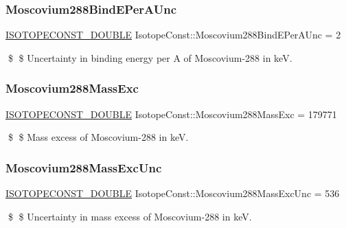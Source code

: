 \subsubsection{\texorpdfstring{Moscovium288\+Bind\+E\+Per\+A\+Unc}{Moscovium288BindEPerAUnc}}
{\footnotesize\ttfamily \mbox{\hyperlink{group___isotope_const-_macros_ga8f45a7272ce02c0b4c65c44636ed719a}{I\+S\+O\+T\+O\+P\+E\+C\+O\+N\+S\+T\+\_\+\+D\+O\+U\+B\+LE}} Isotope\+Const\+::\+Moscovium288\+Bind\+E\+Per\+A\+Unc = 2}

\$ \$ Uncertainty in binding energy per A of Moscovium-\/288 in keV. \mbox{\label{group___isotope_const-_moscovium-_mc288_ga1abf3f1761fec54f884dcca4505b56b6}} 
\subsubsection{\texorpdfstring{Moscovium288\+Mass\+Exc}{Moscovium288MassExc}}
{\footnotesize\ttfamily \mbox{\hyperlink{group___isotope_const-_macros_ga8f45a7272ce02c0b4c65c44636ed719a}{I\+S\+O\+T\+O\+P\+E\+C\+O\+N\+S\+T\+\_\+\+D\+O\+U\+B\+LE}} Isotope\+Const\+::\+Moscovium288\+Mass\+Exc = 179771}

\$ \$ Mass excess of Moscovium-\/288 in keV. \mbox{\label{group___isotope_const-_moscovium-_mc288_gadc300d3a1daad8758187973513b24141}} 
\subsubsection{\texorpdfstring{Moscovium288\+Mass\+Exc\+Unc}{Moscovium288MassExcUnc}}
{\footnotesize\ttfamily \mbox{\hyperlink{group___isotope_const-_macros_ga8f45a7272ce02c0b4c65c44636ed719a}{I\+S\+O\+T\+O\+P\+E\+C\+O\+N\+S\+T\+\_\+\+D\+O\+U\+B\+LE}} Isotope\+Const\+::\+Moscovium288\+Mass\+Exc\+Unc = 536}

\$ \$ Uncertainty in mass excess of Moscovium-\/288 in keV. \mbox{\label{group___isotope_const-_moscovium-_mc288_gacdd5b2ca3025355dad019952f6a9e666}} 

